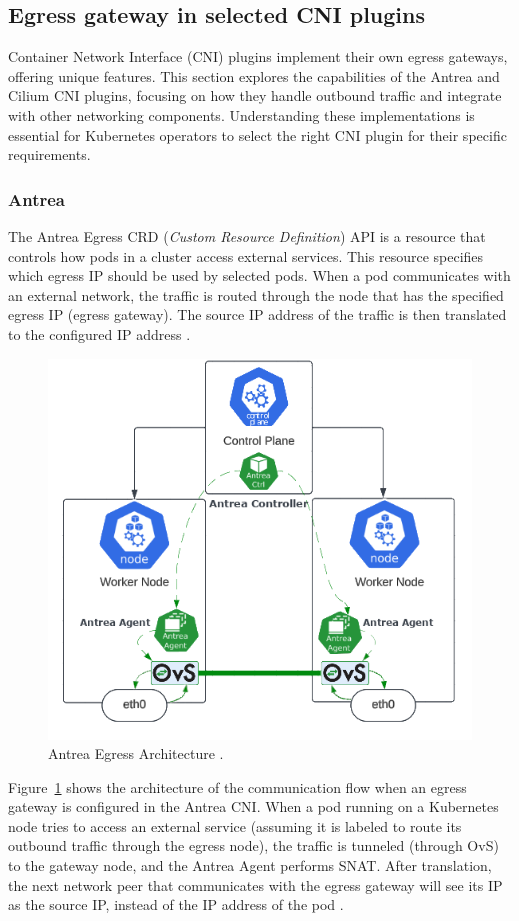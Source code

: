 \subsection{Egress gateway in selected CNI plugins}
\label{subsection:egressGateway}

Container Network Interface (CNI) plugins implement their own egress gateways, offering unique features. This section explores the capabilities of the Antrea and Cilium CNI plugins, focusing on how they handle outbound traffic and integrate with other networking components. Understanding these implementations is essential for Kubernetes operators to select the right CNI plugin for their specific requirements.


\subsubsection{Antrea}
\label{subsection:antreaEgress}

The Antrea Egress CRD (\textit{Custom Resource Definition}) API is a resource that controls how pods in a cluster access external services. This resource specifies which egress IP should be used by selected pods. When a pod communicates with an external network, the traffic is routed through the node that has the specified egress IP (egress gateway). The source IP address of the traffic is then translated to the configured IP address \cite{AntreaDocs}.

\begin{figure}[tbh]
    \centering
    \includegraphics[width=0.6\columnwidth]{images/antrea_overview.png}
    \caption{Antrea Egress Architecture \cite{AntreaDocs}.}
    \label{fig:antreaEgressArch}
\end{figure}


Figure~\ref{fig:antreaEgressArch} shows the architecture of the communication flow when an egress gateway is configured in the Antrea CNI. When a pod running on a Kubernetes node tries to access an external service (assuming it is labeled to route its outbound traffic through the egress node), the traffic is tunneled (through OvS) to the gateway node, and the Antrea Agent performs SNAT. After translation, the next network peer that communicates with the egress gateway will see its IP as the source IP, instead of the IP address of the pod \cite{AntreaDocs}.


